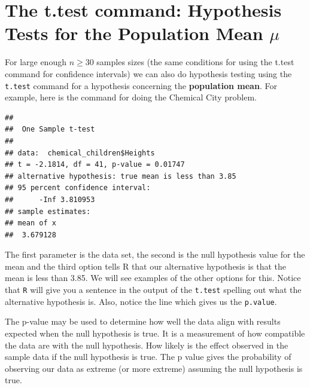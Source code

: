 \documentclass[
]{book}
\newenvironment{Shaded}{\begin{snugshade}}{\end{snugshade}}
\newcommand{\AttributeTok}[1]{\textcolor[rgb]{0.77,0.63,0.00}{#1}}
\newcommand{\FloatTok}[1]{\textcolor[rgb]{0.00,0.00,0.81}{#1}}
\newcommand{\FunctionTok}[1]{\textcolor[rgb]{0.00,0.00,0.00}{#1}}
\newcommand{\NormalTok}[1]{#1}
\newcommand{\SpecialCharTok}[1]{\textcolor[rgb]{0.00,0.00,0.00}{#1}}
\newcommand{\StringTok}[1]{\textcolor[rgb]{0.31,0.60,0.02}{#1}}
\theoremstyle{definition}
\theoremstyle{definition}
\theoremstyle{definition}
\theoremstyle{definition}
\theoremstyle{remark}
\begin{document}
\hypertarget{the-t.test-command-hypothesis-tests-for-the-population-mean-mu}{%
\section{\texorpdfstring{The t.test command: Hypothesis Tests for the Population Mean \(\mu\)}{The t.test command: Hypothesis Tests for the Population Mean \textbackslash mu}}\label{the-t.test-command-hypothesis-tests-for-the-population-mean-mu}}

For large enough \(n \geq 30\) samples sizes (the same conditions for using the t.test command for confidence intervals) we can also do hypothesis testing using the \texttt{t.test} command for a hypothesis concerning the \textbf{population mean}. For example, here is the command for doing the Chemical City problem.

\begin{Shaded}
\end{Shaded}

\begin{verbatim}
## 
##  One Sample t-test
## 
## data:  chemical_children$Heights
## t = -2.1814, df = 41, p-value = 0.01747
## alternative hypothesis: true mean is less than 3.85
## 95 percent confidence interval:
##      -Inf 3.810953
## sample estimates:
## mean of x 
##  3.679128
\end{verbatim}

The first parameter is the data set, the second is the null hypothesis value for the mean and the third option tells R that our alternative hypothesis is that the mean is less than 3.85. We will see examples of the other options for this. Notice that \texttt{R} will give you a sentence in the output of the \texttt{t.test} spelling out what the alternative hypothesis is. Also, notice the line which gives us the \texttt{p.value}.

The p-value may be used to determine how well the data align with results expected when the null hypothesis is true. It is a measurement of how compatible the data are with the null hypothesis. How likely is the effect observed in the sample data if the null hypothesis is true. The p value gives the probability of observing our data as extreme (or more extreme) assuming the null hypothesis is true.
\end{document}
